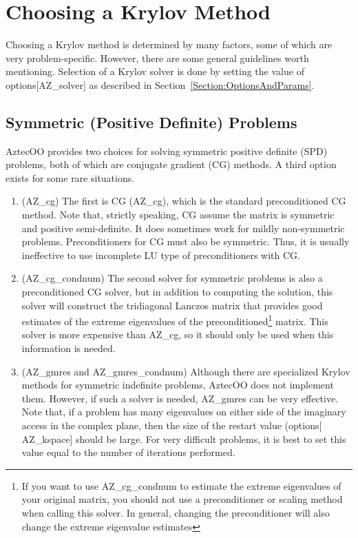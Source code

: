 \documentclass[12pt,relax]{AztecOOUserGuide}
\begin{document}
\section{Choosing a Krylov Method}
\label{Sect:KrylovMethods}

Choosing a Krylov method is determined by many factors, some of
which are very problem-specific.  However, there are some general
guidelines worth mentioning.  Selection of a Krylov solver is done
by setting the value of options[{\sf AZ\_solver}] as described in
Section~\ref{Section:OptionsAndParams}.

\subsection{Symmetric (Positive Definite) Problems}

AztecOO provides two choices for solving symmetric positive definite
(SPD) problems, both of which are conjugate gradient (CG) methods. A
third option exists for some rare situations.
\begin{enumerate}
\item (AZ\_cg) The first is CG (AZ\_cg), which is the standard preconditioned CG
method.  Note that, strictly speaking, CG assume the matrix is
symmetric and positive semi-definite.  It does sometimes work for
mildly non-symmetric problems.  Preconditioners for CG must also be
symmetric.  Thus, it is usually ineffective to use incomplete LU
type of preconditioners with CG.

\item (AZ\_cg\_condnum) The second solver for symmetric problems is
also a preconditioned CG solver, but in addition to computing the
solution, this solver will construct the tridiagonal Lanczos matrix
that provides good estimates of the extreme eigenvalues of the
preconditioned\footnote{If you want to use AZ\_cg\_condnum to
estimate the extreme eigenvalues of your original matrix, you should
not use a preconditioner or scaling method when calling this solver.
 In general, changing the preconditioner will also change the extreme eigenvalue estimates}
 matrix.  This solver is more expensive than AZ\_cg, so it should
 only be used when this information is needed.

\item (AZ\_gmres and AZ\_gmres\_condnum)  Although there are
specialized Krylov methods for symmetric indefinite problems,
AztecOO does not implement them.  However, if such a solver is
needed, AZ\_gmres can be very effective.  Note that, if a problem
has many eigenvalues on either side of the imaginary access in the
complex plane, then the size of the restart value (options[{\sf
AZ\_kspace}] should be large.  For very difficult problems, it is
best to set this value equal to the number of iterations performed.

\end{enumerate}
\end{document}
